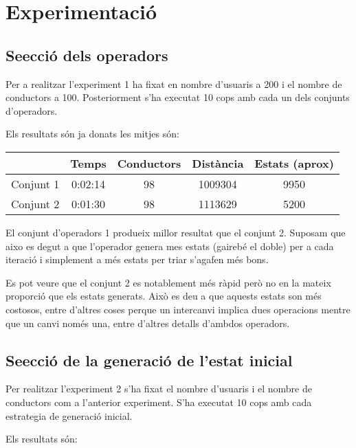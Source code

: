 \section{Experimentació}

\subsection{Se\lgem ecció dels operadors}
Per a realitzar l'experiment 1 ha fixat en nombre d'usuaris a 200 i el nombre de conductors a 100.
Posteriorment s'ha executat 10 cops amb cada un dels conjunts d'operadors.


Els resultats són ja donats les mitjes són:

\begin{center}
\begin{tabular}{l|cccc}
         & Temps & Conductors & Distància & Estats (aprox)\\
\hline
Conjunt 1 & 0:02:14 & 98 & 1009304 & 9950 \\
Conjunt 2 & 0:01:30 & 98 & 1113629 & 5200
\end{tabular}
\end{center}


El conjunt d'operadors 1 produeix millor resultat que el conjunt 2.
Suposam que aixo es degut a que l'operador genera mes estats (gairebé el doble) per a cada iteració i simplement a més estats per triar s'agafen més bons.

Es pot veure que el conjunt 2 es notablement més ràpid però no en la mateix proporció que els estats generats. Això es deu a que aquests estats
son més costosos, entre d'altres coses perque un intercanvi implica dues operacions mentre que un canvi només una, entre d'altres detalls d'ambdos operadors.


\subsection{Se\lgem ecció de la generació de l'estat inicial}
Per realitzar l'experiment 2 s'ha fixat el nombre d'usuaris i el nombre de conductors com a l'anterior experiment.                                                                                   
S'ha executat 10 cops amb cada estrategia de generació inicial.
                                                                                                                                                                                                     
Els resultats són:


